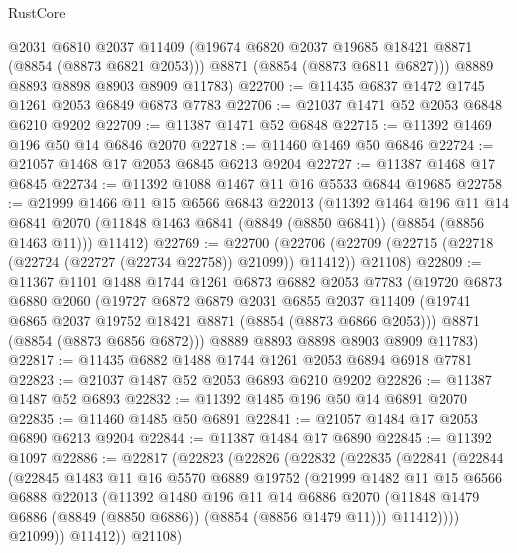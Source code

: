 \begin{lexlean}{RustCore}
\begin{coremodule}
        @2031
        @6810
        @2037
        @11409
        (@19674 @6820 @2037 @19685 @18421 @8871 (@8854 (@8873 @6821 @2053)))
        @8871
        (@8854 (@8873 @6811 @6827)))
      @8889
      @8893
      @8898
      @8903
      @8909
      @11783)
@22700 := @11435 @6837 @1472 @1745 @1261 @2053 @6849 @6873 @7783
@22706 := @21037 @1471 @52 @2053 @6848 @6210 @9202
@22709 := @11387 @1471 @52 @6848
@22715 := @11392 @1469 @196 @50 @14 @6846 @2070
@22718 := @11460 @1469 @50 @6846
@22724 := @21057 @1468 @17 @2053 @6845 @6213 @9204
@22727 := @11387 @1468 @17 @6845
@22734 := @11392 @1088 @1467 @11 @16 @5533 @6844 @19685
@22758 := @21999
    @1466
    @11
    @15
    @6566
    @6843
    @22013
    (@11392
      @1464
      @196
      @11
      @14
      @6841
      @2070
      (@11848 @1463 @6841 (@8849 (@8850 @6841)) (@8854 (@8856 @1463 @11)))
      @11412)
@22769 := @22700
    (@22706 (@22709 (@22715 (@22718 (@22724 (@22727 (@22734 @22758)) @21099)) @11412)) @21108)
@22809 := @11367
    @1101
    @1488
    @1744
    @1261
    @6873
    @6882
    @2053
    @7783
    (@19720
      @6873
      @6880
      @2060
      (@19727
        @6872
        @6879
        @2031
        @6855
        @2037
        @11409
        (@19741 @6865 @2037 @19752 @18421 @8871 (@8854 (@8873 @6866 @2053)))
        @8871
        (@8854 (@8873 @6856 @6872)))
      @8889
      @8893
      @8898
      @8903
      @8909
      @11783)
@22817 := @11435 @6882 @1488 @1744 @1261 @2053 @6894 @6918 @7781
@22823 := @21037 @1487 @52 @2053 @6893 @6210 @9202
@22826 := @11387 @1487 @52 @6893
@22832 := @11392 @1485 @196 @50 @14 @6891 @2070
@22835 := @11460 @1485 @50 @6891
@22841 := @21057 @1484 @17 @2053 @6890 @6213 @9204
@22844 := @11387 @1484 @17 @6890
@22845 := @11392 @1097
@22886 := @22817
    (@22823
      (@22826
        (@22832
          (@22835
            (@22841
              (@22844
                (@22845
                  @1483
                  @11
                  @16
                  @5570
                  @6889
                  @19752
                  (@21999
                    @1482
                    @11
                    @15
                    @6566
                    @6888
                    @22013
                    (@11392
                      @1480
                      @196
                      @11
                      @14
                      @6886
                      @2070
                      (@11848 @1479 @6886 (@8849 (@8850 @6886)) (@8854 (@8856 @1479 @11)))
                      @11412))))
              @21099))
          @11412))
      @21108)

\end{coremodule}
\end{lexlean}
